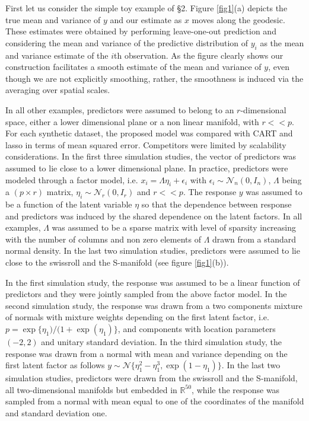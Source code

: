 \documentclass{article}
\newcommand{\Real}{\mathbb{R}}
\providecommand{\mc}[1]{\mathcal{#1}}
\begin{document}
First let us consider the simple toy example of \S 2. Figure \ref{fig1}(a) depicts the true mean and variance of $y$ and our estimate as $x$ moves along the geodesic. These estimates were obtained by performing leave-one-out prediction and considering the mean and variance of the predictive distribution of $y_i$ as the mean and variance estimate of the $i$th observation. As the figure clearly shows our construction facilitates a smooth estimate of the mean and variance of $y$, even though we are not explicitly smoothing, rather, the smoothness is induced via the averaging over spatial scales.





In all other examples, predictors were assumed to belong to an $r$-dimensional space, either a lower dimensional plane or a non linear manifold, with $r<<p$. For each synthetic dataset, the proposed model was compared with CART and lasso in terms of mean squared error. Competitors were limited by scalability considerations. In the first three simulation studies, the vector of predictors was assumed to lie close to a lower dimensional plane. In practice,  predictors were modeled through a factor model, i.e. $x_i=\Lambda \eta_i + \epsilon_i$ with $\epsilon_i \sim \mc{N}_n(0,I_n)$, $\Lambda$ being a $(p \times r)$ matrix, $\eta_i \sim \mc{N}_r(0,I_r)$ and $r<<p$. The response $y$ was assumed to be a function of the latent variable $\eta$ so that  the dependence between response and predictors was induced by the shared dependence on the latent factors.  In all examples, $\Lambda$ was assumed to be a sparse matrix with level of sparsity increasing with the number of columns and non zero elements of $\Lambda$ drawn from a standard normal density. In the last two simulation studies, predictors were assumed to lie close to the swissroll and the S-manifold (see figure \ref{fig1}(b)).
%


In the first simulation study, the response was assumed to be a linear function of predictors and they were jointly sampled from the above factor model.  In the second simulation study,  the response was drawn from a two components mixture of normals with mixture weights depending on the first latent factor, i.e. $p=\exp\{\eta_1)/(1+\exp(\eta_1)\}$, and components with location parameters $(-2,2)$ and unitary standard deviation.  In the third simulation study, the response was drawn from a normal with mean and variance depending on the first latent factor as follows $y \sim \mc{N}\{\eta_1^2-\eta_1^3, \exp(1-\eta_1)\}$. In the last two simulation studies, predictors were drawn from the swissroll and the S-manifold, all two-dimensional manifolds but embedded in $\Real^{50}$, while the response was sampled from a normal with mean equal to one of the coordinates of the manifold and standard deviation one.
\end{document}
